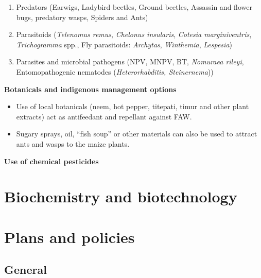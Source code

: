\documentclass[
  openany]{book}
\providecommand{\tightlist}{%
  \setlength{\itemsep}{0pt}\setlength{\parskip}{0pt}}
\begin{document}
\begin{enumerate}
\def\labelenumi{\arabic{enumi}.}
\tightlist
\item
  Predators (Earwigs, Ladybird beetles, Ground beetles, Assassin and flower bugs, predatory wasps, Spiders and Ants)
\item
  Parasitoids (\emph{Telenomus remus}, \emph{Chelonus insularis}, \emph{Cotesia marginiventris}, \emph{Trichogramma} spp., Fly parasitoids: \emph{Archytas}, \emph{Winthemia}, \emph{Lespesia})
\item
  Parasites and microbial pathogens (NPV, MNPV, BT, \emph{Nomuraea rileyi}, Entomopathogenic nematodes (\emph{Heterorhabditis, Steinernema}))
\end{enumerate}

\textbf{Botanicals and indigenous management options}

\begin{itemize}
\tightlist
\item
  Use of local botanicals (neem, hot pepper, titepati, timur and other plant extracts) act as antifeedant and repellant against FAW.
\item
  Sugary sprays, oil, ``fish soup'' or other materials can also be used to attract ants and wasps to the maize plants.
\end{itemize}

\textbf{Use of chemical pesticides}

\hypertarget{biochemistry-and-biotechnology}{%
\chapter{Biochemistry and biotechnology}\label{biochemistry-and-biotechnology}}

\hypertarget{plans-and-policies}{%
\chapter{Plans and policies}\label{plans-and-policies}}

\hypertarget{general}{%
\section{General}\label{general}}
\end{document}
